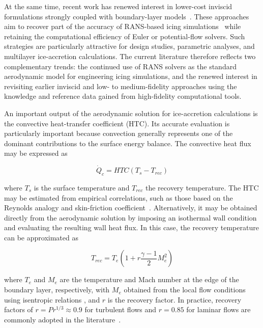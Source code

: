 At the same time, recent work has renewed interest in lower-cost inviscid formulations strongly coupled with boundary-layer models~\cite{lavoieLevelSet,pabloIcing,guillaumeAuger}. These approaches aim to recover part of the accuracy of RANS-based icing simulations~\cite{cousteix2005modeling, laurendeau2003drag} while retaining the computational efficiency of Euler or potential-flow solvers. Such strategies are particularly attractive for design studies, parametric analyses, and multilayer ice-accretion calculations. The current literature therefore reflects two complementary trends: the continued use of RANS solvers as the standard aerodynamic model for engineering icing simulations, and the renewed interest in revisiting earlier inviscid and low- to medium-fidelity approaches using the knowledge and reference data gained from high-fidelity computational tools.

An important output of the aerodynamic solution for ice-accretion calculations is the convective heat-transfer coefficient (HTC). Its accurate evaluation is particularly important because convection generally represents one of the dominant contributions to the surface energy balance. The convective heat flux may be expressed as

\begin{equation}
    \dot{Q}_c = HTC \left(T_s - T_{rec}\right)
    \label{eq:convective_heat_flux}
\end{equation}

where $T_s$ is the surface temperature and $T_{rec}$  the recovery temperature. The HTC may be estimated from empirical correlations, such as those based on the Reynolds analogy and skin-friction coefficient~\cite{kays2005convective}. Alternatively, it may be obtained directly from the aerodynamic solution by imposing an isothermal wall condition and evaluating the resulting wall heat flux. In this case, the recovery temperature can be approximated as

\begin{equation}
    T_{rec}
    =
    T_e
    \left(
        1+r\frac{\gamma-1}{2}M_e^2
    \right)
    \label{eq:recovery_temperature}
\end{equation}

where $T_e$ and $M_e$ are the temperature and Mach number at the edge of the boundary layer, respectively, with $M_e$ obtained from the local flow conditions using isentropic relations \cite{radenac2024workflow}, and $r$ is the recovery factor.
In practice, recovery factors of $r=Pr^{1/3}\approx0.9$ for turbulent flows and $r=0.85$ for laminar flows are commonly adopted in the literature~\cite{montreuilHTC}.

